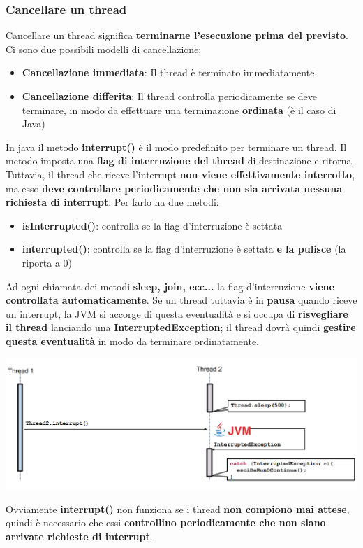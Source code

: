 \documentclass[12pt]{article}
\begin{document}
\subsubsection{Cancellare un thread}
Cancellare un thread significa \textbf{terminarne l'esecuzione prima del previsto}. Ci sono due possibili modelli di cancellazione:
\begin{itemize}
    \item \textbf{Cancellazione immediata}: Il thread è terminato immediatamente
    \item \textbf{Cancellazione differita}: Il thread controlla periodicamente se deve terminare, in modo da effettuare una terminazione \textbf{ordinata} (è il caso di Java)
\end{itemize}
In java il metodo \textbf{interrupt()} è il modo predefinito per terminare un thread. Il metodo imposta una \textbf{flag di interruzione del thread} di destinazione e ritorna. Tuttavia, il thread che riceve l'interrupt \textbf{non viene effettivamente interrotto}, ma esso \textbf{deve controllare periodicamente che non sia arrivata nessuna richiesta di interrupt}. Per farlo ha due metodi:
\begin{itemize}
    \item \textbf{isInterrupted()}: controlla se la flag d'interruzione è settata
    \item \textbf{interrupted()}: controlla se la flag d'interruzione è settata \textbf{e la pulisce} (la riporta a 0)
\end{itemize}
Ad ogni chiamata dei metodi \textbf{sleep, join, ecc...} la flag d'interruzione \textbf{viene controllata automaticamente}. Se un thread tuttavia è in \textbf{pausa} quando riceve un interrupt, la JVM si accorge di questa eventualità e si occupa di \textbf{risvegliare il thread} lanciando una \textbf{InterruptedException}; il thread dovrà quindi \textbf{gestire questa eventualità} in modo da terminare ordinatamente.
\begin{center}
    \includegraphics[width = 1\textwidth]{Images/74.PNG}
\end{center}
Ovviamente \textbf{interrupt()} non funziona se i thread \textbf{non compiono mai attese}, quindi è necessario che essi \textbf{controllino periodicamente che non siano arrivate richieste di interrupt}.
\end{document}
